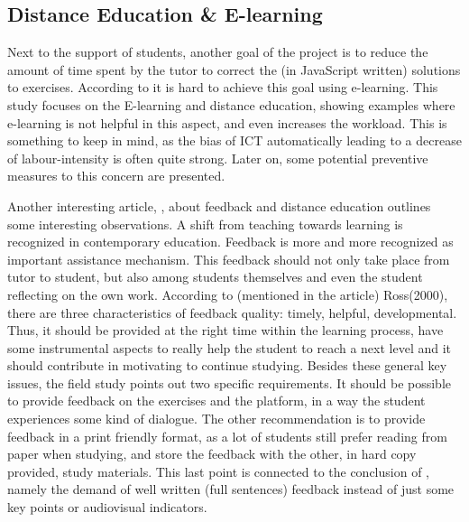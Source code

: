\documentclass{article}
\begin{document}
\subsection{Distance Education \& E-learning}

Next to the support of students, another goal of the project is to reduce the 
amount of time spent by the tutor to correct the (in JavaScript written) 
solutions to exercises. According to
\citep{guri2005distance}
it is hard to achieve this goal using 
e-learning. This study focuses on the E-learning and distance education, 
showing
examples where e-learning is not helpful in this aspect, and even 
increases the workload. This is something to keep in mind, as the bias of 
ICT automatically leading to a decrease of labour-intensity is often quite 
strong. Later on, some potential preventive measures to this concern
are presented.


Another interesting article, 
\citep{ypsilandis2002feedback}
, about feedback and distance education 
outlines some interesting observations. A shift from teaching towards learning
is recognized in contemporary education. Feedback is more and more 
recognized as important assistance mechanism. This feedback should not only
take place from tutor to student, but also among students themselves and even
the student reflecting on the own work. According to (mentioned in the
article) Ross(2000), there are three characteristics of feedback quality:
timely, helpful, developmental. Thus, it
should be provided at the right time within the learning process, have some 
instrumental aspects to really help the student to reach a next level and it 
should contribute in motivating to continue studying. Besides these general 
key issues, the field study points out two specific requirements. It should be
possible to provide feedback on the exercises and the platform, in a way the
student experiences some kind of dialogue. The other
recommendation is to provide feedback in a print friendly format, as a lot of 
students still prefer reading from paper when studying, and store
the feedback with the other,
in hard copy provided, study materials. This last point is connected to the conclusion 
of \citep{shepherdgraduate}, namely the demand of well written
(full sentences) 
feedback instead of just some key points or audiovisual indicators.
\end{document}
